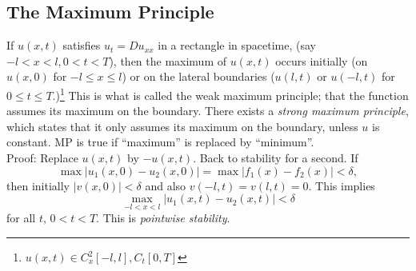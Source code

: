 \documentclass[cm]{article}
\begin{document}
\subsection{The Maximum Principle}
If $u(x,t)$ satisfies $u_t = Du_{xx}$ in a rectangle in spacetime, (say $-l < x < l, 0 < t < T$), then the maximum of $u(x,t)$ occurs initially (on $u(x,0)$ for $-l \leq x \leq l$) or on the lateral boundaries ($u(l,t)$ or $u(-l,t)$ for $0 \leq t \leq T$.)\footnote{$u(x,t) \in C_x^2[-l,l],C_t[0,T]$} This is what is called the weak maximum principle; that the function assumes its maximum on the boundary. There exists a \emph{strong maximum principle}, which states that it only assumes its maximum on the boundary, unless $u$ is constant.
\xthm
{}
MP is true if ``maximum'' is replaced by ``minimum''.\\
Proof: Replace $u(x,t)$ by $-u(x,t)$.
\xcor
Back to stability for a second. If
$$\max|u_1(x,0) - u_2(x,0)| = \max|f_1(x) - f_2(x)| < \delta,$$
then initially $|v(x,0)| < \delta$ and also $v(-l,t) = v(l,t) = 0$. This implies
$$\max_{-l < x < l} |u_1(x,t) - u_2(x,t)| < \delta$$
for all $t$, $0 < t < T$. This is \emph{pointwise stability}.
\end{document}
